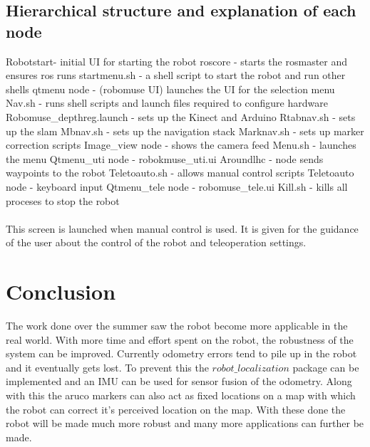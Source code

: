 \documentclass[12pt]{article}
\begin{document}
\subsection{Hierarchical structure and explanation of each node}
Robotstart- initial UI for starting the robot
	roscore - starts the rosmaster and ensures ros runs
startmenu.sh - a shell script to start the robot and run other shells 
	qtmenu node - (robomuse UI) launches the UI for the selection menu
		Nav.sh - runs shell scripts and launch files required to configure hardware
			Robomuse\_depthreg.launch - sets up the Kinect and Arduino
			Rtabnav.sh - sets up the slam
			Mbnav.sh - sets up the navigation stack
			Marknav.sh - sets up marker correction scripts
			Image\_view node - shows the camera feed
			Menu.sh - launches the menu
				Qtmenu\_uti node - robokmuse\_uti.ui
					Aroundlhc - node sends waypoints to the robot
					Teletoauto.sh - allows manual control scripts
						Teletoauto node - keyboard input
						Qtmenu\_tele node - robomuse\_tele.ui	
					Kill.sh - kills all proceses to stop the robot
\\ \\
This screen is launched when manual control is used. It is given for the guidance of the user about the control of the robot and teleoperation settings. 

\newpage

\section{Conclusion}
The work done over the summer saw the robot become more applicable in the real world. With more time and effort spent on the robot, the robustness of the system can be improved. Currently odometry errors tend to pile up in the robot and it eventually gets lost. To prevent this the $robot\_localization$ package can be implemented and an IMU can be used for sensor fusion of the odometry. Along with this the aruco markers can also act as fixed locations on a map with which the robot can correct it’s perceived  location on the map. With these done the robot will be made much more robust and many more applications can further be made.
\end{document}
